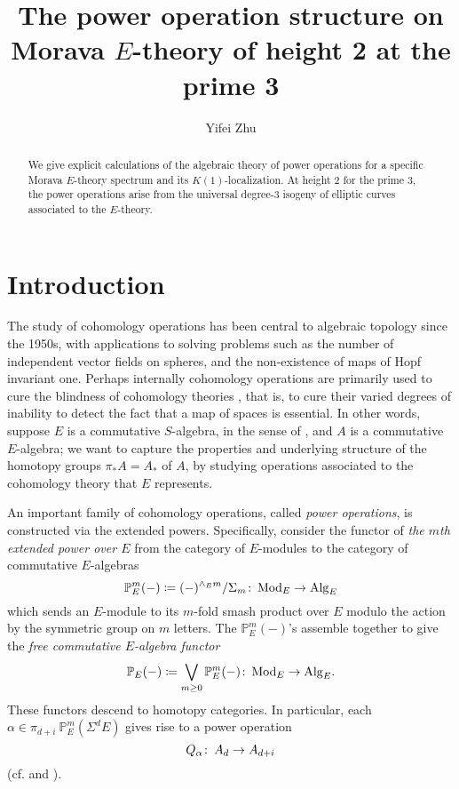 \documentclass{gtpart}
\title{The power operation structure on Morava $E$-theory of height 2 at the prime 3}
\author{Yifei Zhu}
\theoremstyle{definition}
\theoremstyle{remark}
\def\co{\colon\thinspace}
\newcommand{\mb}[1]{\mathbb{#1}}
\newcommand{\Mod}{{\rm Mod}}
\newcommand{\Alg}{{\rm Alg}}
\newcommand{\cff}[2]{cf.\thinspace{\cite[#1]{#2}}}
\newcommand{\BP}{{\mb P}}
\newcommand{\A}{\alpha}
\begin{document}
\begin{abstract}
 We give explicit calculations of the algebraic theory of power operations for a specific Morava $E$-theory spectrum and its $K(1)$-localization.  
 At height 2 for the prime 3, the power operations arise from the universal degree-3 isogeny of elliptic curves associated to the $E$-theory.  
\end{abstract}


\maketitle
\section{Introduction}
\label{sec:intro}

The study of cohomology operations has been central to algebraic topology 
since the 1950s, with applications to solving problems such as the number of independent vector fields 
on spheres, and the non-existence of maps of Hopf invariant one.  
Perhaps internally cohomology operations are primarily used to cure the blindness of cohomology theories \cite{blind}, 
that is, to cure their varied degrees of inability to detect the fact that a map of spaces is essential.  
In other words, suppose $E$ is a commutative $S$-algebra, in the sense of \cite{EKMM}, and $A$ is a commutative $E$-algebra; 
we want to capture the properties and underlying structure of the homotopy groups $\pi_* A = A_*$ of $A$, 
by studying operations associated to the cohomology theory that $E$ represents.  

An important family of cohomology operations, called {\em power operations}, is constructed via the extended powers.  
Specifically, consider the functor of {\em the $m$th extended power over $E$} from the category of $E$-modules to the category of commutative $E$-algebras 
\[
 \BP_E^m (-) \coloneqq (-)^{\wedge_E m} / \Sigma_m \co \Mod_E \to \Alg_E 
\]
which sends an $E$-module to its $m$-fold smash product over $E$ modulo the action by the symmetric group on $m$ letters.  
The $\BP_E^m (-)$'s assemble together to give the {\em free commutative $E$-algebra functor} 
\[
 \BP_E (-) \coloneqq \bigvee_{m \geq 0} \BP_E^m (-) \co \Mod_E \to \Alg_E.  
\]
These functors descend to homotopy categories.  
In particular, each $\A \in \pi_{d+i}~\BP_E^m (\Sigma^d E)$ gives rise to a power operation 
\[
 Q_\A \co A_d \to A_{d+i} 
\]
(\cff{Sections I.2 and IX.1}{H_infty} and \cite[Section 3]{cong}).  
\end{document}
